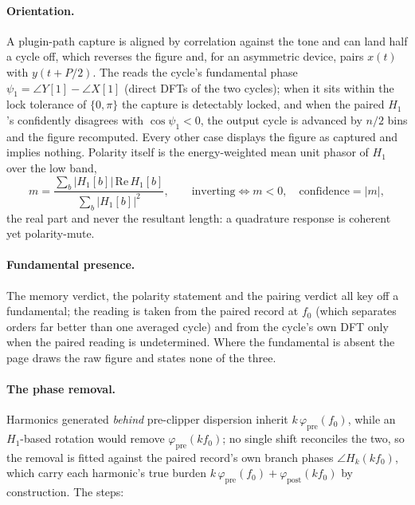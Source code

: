 \documentclass[11pt,a4paper]{article}
\begin{document}
\paragraph{Orientation.}
A plugin-path capture is aligned by correlation against the tone and can
land half a cycle off, which reverses the figure and, for an asymmetric
device, pairs $x(t)$ with $y(t + P/2)$. The  reads the
cycle's fundamental phase $\psi_1 = \angle Y[1] - \angle X[1]$ (direct DFTs
of the two cycles); when it sits within the lock tolerance of $\{0, \pi\}$
the capture is detectably locked, and when the paired $H_1$'s
 confidently disagrees with $\cos\psi_1 < 0$, the output
cycle is advanced by $n/2$ bins and the figure recomputed. Every other case
displays the figure as captured and implies nothing. Polarity itself is the
energy-weighted mean unit phasor of $H_1$ over the low band,
\begin{equation}
  m = \frac{\sum_b |H_1[b]|\,\mathrm{Re}\,H_1[b]}{\sum_b |H_1[b]|^2},\qquad
  \text{inverting} \Leftrightarrow m < 0,\quad \text{confidence} = |m| ,
  \label{eq:polarity}
\end{equation}
the real part and never the resultant length: a quadrature response is
coherent yet polarity-mute.

\paragraph{Fundamental presence.}
The memory verdict, the polarity statement and the pairing verdict all key
off a fundamental; the  reading is taken from
the paired record at $f_0$ (which separates orders far better than one
averaged cycle) and from the cycle's own DFT only when the paired reading is
undetermined. Where the fundamental is absent the page draws the raw figure
and states none of the three.

\paragraph{The phase removal.}
\label{sec:transfer-removal}
Harmonics generated \emph{behind} pre-clipper dispersion inherit
$k\,\varphi_{\mathrm{pre}}(f_0)$, while an $H_1$-based rotation would remove
$\varphi_{\mathrm{pre}}(k f_0)$; no single shift reconciles the two, so the
removal is fitted against the paired record's own branch phases
$\angle H_k(k f_0)$, which carry each harmonic's true burden
$k\,\varphi_{\mathrm{pre}}(f_0) + \varphi_{\mathrm{post}}(k f_0)$ by
construction. The steps:
\end{document}
